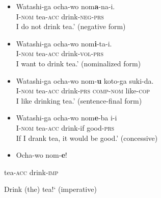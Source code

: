 \documentclass[output=paper]{langscibook}
\begin{document}
\begin{itemize}
\item \begin{styleBeispielCinqueKapitel}
\label{bkm:Ref164258117}Watashi-ga ocha-wo nom\textbf{a}{}-na-i.\\
I-\textsc{nom} tea-\textsc{acc} drink-\textsc{neg-prs}\\
{\textasciigrave}I do not drink tea.’     (negative form)
\end{styleBeispielCinqueKapitel}
\item \begin{styleBeispielCinqueKapitel}
Watashi-ga ocha-wo nom\textbf{i}{}-ta-i.\\
I-\textsc{nom} tea-\textsc{acc} drink-\textsc{vol-prs}\\
{\textasciigrave}I want to drink tea.’     (nominalized form)
\end{styleBeispielCinqueKapitel}
\item \begin{styleBeispielCinqueKapitel}
Watashi-ga ocha-wo nom-\textbf{u} koto-ga suki-da.\\
I-\textsc{nom} tea-\textsc{acc} drink-\textsc{prs} \textsc{comp}{}-\textsc{nom} like-\textsc{cop}\\
{\textasciigrave}I like drinking tea.’     (sentence-final form)
\end{styleBeispielCinqueKapitel}
\item \begin{styleBeispielCinqueKapitel}
Watashi-ga ocha-wo nom\textbf{e}{}-ba i-i\\
I-\textsc{nom} tea-\textsc{acc} drink-if good-\textsc{prs}\\
{\textasciigrave}If I drank tea, it would be good.’   (concessive)
\end{styleBeispielCinqueKapitel}
\item \begin{styleBeispielCinqueKapitel}
Ocha-wo nom-\textbf{e}!
\end{styleBeispielCinqueKapitel}
\end{itemize}
\begin{styleBeispielCinqueKapitel}
tea-\textsc{acc} drink-\textsc{imp}
\end{styleBeispielCinqueKapitel}

\begin{styleBeispielCinqueKapitel}
{\textasciigrave}Drink (the) tea!‘     (imperative)
\end{styleBeispielCinqueKapitel}
\end{document}
